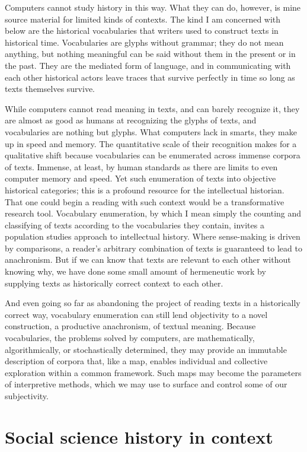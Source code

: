 \documentclass[]{book}
\theoremstyle{definition}
\theoremstyle{definition}
\theoremstyle{definition}
\theoremstyle{remark}
\begin{document}
Computers cannot study history in this way. What they can do, however,
is mine source material for limited kinds of contexts. The kind I am
concerned with below are the historical vocabularies that writers used
to construct texts in historical time. Vocabularies are glyphs without
grammar; they do not mean anything, but nothing meaningful can be said
without them in the present or in the past. They are the mediated form
of language, and in communicating with each other historical actors
leave traces that survive perfectly in time so long as texts themselves
survive.

While computers cannot read meaning in texts, and can barely recognize
it, they are almost as good as humans at recognizing the glyphs of
texts, and vocabularies are nothing but glyphs. What computers lack in
smarts, they make up in speed and memory. The quantitative scale of
their recognition makes for a qualitative shift because vocabularies can
be enumerated across immense corpora of texts. Immense, at least, by
human standards as there are limits to even computer memory and speed.
Yet such enumeration of texts into objective historical categories; this
is a profound resource for the intellectual historian. That one could
begin a reading with such context would be a transformative research
tool. Vocabulary enumeration, by which I mean simply the counting and
classifying of texts according to the vocabularies they contain, invites
a population studies approach to intellectual history. Where
sense-making is driven by comparisons, a reader's arbitrary combination
of texts is guaranteed to lead to anachronism. But if we can know that
texts are relevant to each other without knowing why, we have done some
small amount of hermeneutic work by supplying texts as historically
correct context to each other.

And even going so far as abandoning the project of reading texts in a
historically correct way, vocabulary enumeration can still lend
objectivity to a novel construction, a productive anachronism, of
textual meaning. Because vocabularies, the problems solved by computers,
are mathematically, algorithmically, or stochastically determined, they
may provide an immutable description of corpora that, like a map,
enables individual and collective exploration within a common framework.
Such maps may become the parameters of interpretive methods, which we
may use to surface and control some of our subjectivity.

\hypertarget{social-science-history-in-context}{%
\section{Social science history in
context}\label{social-science-history-in-context}}
\end{document}
